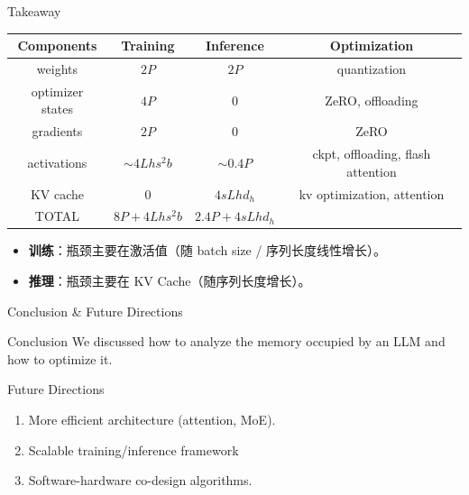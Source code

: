 \documentclass[aspectratio=169]{beamer}
\begin{document}
\begin{frame}{Takeaway}
    \begin{center}
    \small
    \renewcommand{\arraystretch}{1.3}
    \begin{tabular}{cccc}
      \toprule
      \textbf{Components} & \textbf{Training}  & \textbf{Inference} & \textbf{Optimization}             \\\midrule
      weights             & $2P$               & $2P$               & quantization                      \\\midrule
      optimizer states    & $4P$              & 0                  & ZeRO, offloading                  \\\midrule
      gradients           & $2P$               & 0                  & ZeRO                              \\\midrule
      activations         & $\sim 4Lhs^2b$     & $\sim 0.4P$        & ckpt, offloading, flash attention \\\midrule
      KV cache            & 0                  & $4sLhd_h$          & kv optimization, attention        \\\midrule
      TOTAL               & $8P+4Lhs^2b$ & $2.4P+4sLhd_h$     &                                   \\ 
      \bottomrule
    \end{tabular}
  \end{center}
  \begin{itemize}
    \item \textbf{训练}：瓶颈主要在激活值（随 batch size / 序列长度线性增长）。
    \item \textbf{推理}：瓶颈主要在 KV Cache（随序列长度增长）。
  \end{itemize}
\end{frame}



\begin{frame}{Conclusion \& Future Directions}
    \begin{block}{Conclusion}
        We discussed how to analyze the memory occupied by an LLM and how to optimize it.
    \end{block}

    \begin{block}{Future Directions}
        \begin{enumerate}
            \item More efficient architecture (attention, MoE).
            \item Scalable training/inference framework
            \item Software-hardware co-design algorithms.
        \end{enumerate}
    \end{block}
\end{frame}
\end{document}
